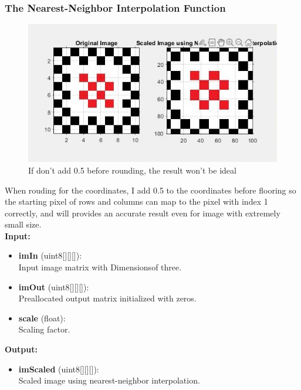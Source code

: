 \documentclass[a4paper,11pt]{article}
\begin{document}
\subsubsection{The Nearest-Neighbor Interpolation Function}
\begin{figure}[H]
    \centering
    \includegraphics[width=0.8\linewidth]{Don't support Pixel image.jpg}
    \caption{If don't add 0.5 before rounding, the result won't be ideal}
    \label{pic:Issue2}
\end{figure}
When rouding for the coordinates, I add 0.5 to the coordinates before flooring so the starting pixel of rows and columns can map to the pixel with index 1 correctly, and will provides an accurate result even for image with extremely small size.\\
\textbf{Input:}
\begin{itemize}
    \item \textbf{imIn} (uint8[][][]):\\
        Input image matrix with Dimensionsof three.
    \item \textbf{imOut} (uint8[][][]):\\
        Preallocated output matrix initialized with zeros.
    \item \textbf{scale} (float):\\
        Scaling factor.
\end{itemize}

\textbf{Output:}
\begin{itemize}
    \item \textbf{imScaled} (uint8[][][]):\\
        Scaled image using nearest-neighbor interpolation.
\end{itemize}
\end{document}
